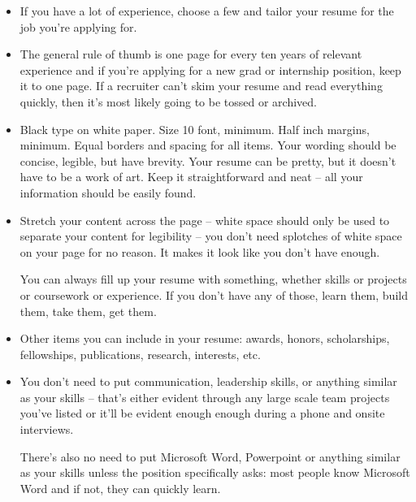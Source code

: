 \documentclass{article}
\begin{document}
\begin{itemize}
\item If you have a lot of experience, choose a few and tailor your resume
  for the job you're applying for.
\item The general rule of thumb is one page for every ten years of relevant
  experience and if you're applying for a new grad or internship position, keep
  it to one page. If a recruiter can't skim your resume and read everything
  quickly, then it's most likely going to be tossed or archived.
\item Black type on white paper. Size 10 font, minimum. Half inch margins,
  minimum. Equal borders and spacing for all items. Your wording should be
  concise, legible, but have brevity. Your resume can be pretty, but it doesn't
  have to be a work of art. Keep it straightforward and neat -- all your
  information should be easily found.
\item Stretch your content across the page -- white space should only be used to
  separate your content for legibility -- you don't need splotches of white
  space on your page for no reason. It makes it look like you don't have enough.

  You can always fill up your resume with something, whether skills or projects
  or coursework or experience. If you don't have any of those, learn them, build
  them, take them, get them.
\item Other items you can include in your resume: awards, honors, scholarships,
  fellowships, publications, research, interests, etc.
\item You don't need to put communication, leadership skills, or anything
  similar as your skills -- that's either evident through any large scale team
  projects you've listed or it'll be evident enough enough during a phone and
  onsite interviews.

  There's also no need to put Microsoft Word, Powerpoint or anything similar as
  your skills unless the position specifically asks: most people know Microsoft
  Word and if not, they can quickly learn.


\end{itemize}
\end{document}
